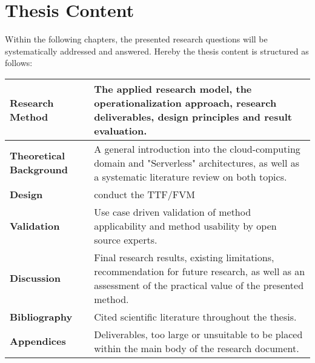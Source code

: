 \section{Thesis Content}

Within the following chapters, the presented research questions will be systematically addressed and answered. Hereby the thesis content is structured as follows:

\begin{center}
\begin{tabular}{ | m{11em} | m{23em}| } 
\hline
 \textbf{Research Method} & 
 The applied research model, the operationalization approach, research deliverables, design principles and result evaluation.  \\
 \hline 
 
 \textbf{Theoretical Background} & 
 A general introduction into the cloud-computing domain and "Serverless" architectures, as well as a systematic literature review on both topics. \\
 \hline 
 
 \textbf{Design} & 
 conduct the TTF/FVM \\
 \hline 
 
 \textbf{Validation} & 
 Use case driven validation of method applicability and method usability by open source experts. \\
 \hline 
 
 \textbf{Discussion} & 
 Final research results, existing limitations, recommendation for future research, as well as an assessment of the practical value of the presented method. \\
 \hline 
 
 \textbf{Bibliography} & 
 Cited scientific literature throughout the thesis. \\
 \hline 
 
 \textbf{Appendices} & 
 Deliverables, too large or unsuitable to be placed within the main body of the research document. \\
\hline
\end{tabular}
\end{center}

